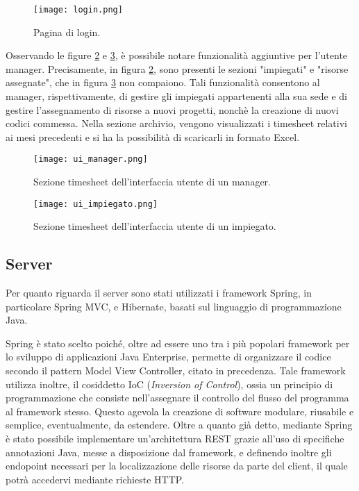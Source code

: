 \begin{figure}[H]
	\centering
	\texttt{[image: login.png]}
	\caption{Pagina di login.}	
	\label{fig:ui_login}
\end{figure}

\noindent
Osservando le figure \ref{fig:ui_manager} e \ref{fig:ui_impiegato}, è possibile notare funzionalità aggiuntive per l'utente manager. Precisamente, in figura \ref{fig:ui_manager}, sono presenti le sezioni "impiegati" e "risorse assegnate", che in figura \ref{fig:ui_impiegato} non compaiono. Tali funzionalità consentono al manager, rispettivamente, di gestire gli impiegati appartenenti alla sua sede e di gestire l'assegnamento di risorse a nuovi progetti, nonchè la creazione di nuovi codici commessa. Nella sezione archivio, vengono visualizzati i timesheet relativi ai mesi precedenti e si ha la possibilità di scaricarli in formato Excel.

\begin{figure}[H]
	\centering
	\texttt{[image: ui\_manager.png]}
	\caption{Sezione timesheet dell'interfaccia utente di un manager.}	
	\label{fig:ui_manager}
\end{figure}

\begin{figure}[H]
	\centering
	\texttt{[image: ui\_impiegato.png]}
	\caption{Sezione timesheet dell'interfaccia utente di un impiegato.}	
	\label{fig:ui_impiegato}
\end{figure}

\subsection{Server}
Per quanto riguarda il server sono stati utilizzati i framework Spring, in particolare Spring MVC, e Hibernate, basati sul linguaggio di programmazione Java.

Spring è stato scelto poiché, oltre ad essere uno tra i più popolari framework per lo sviluppo di applicazioni Java Enterprise, permette di organizzare il codice secondo il pattern Model View Controller, citato in precedenza. Tale framework utilizza inoltre, il cosiddetto IoC (\textit{Inversion of Control}), ossia un principio di programmazione che consiste nell'assegnare il controllo del flusso del programma al framework stesso. Questo agevola la creazione di software modulare, riusabile e semplice, eventualmente, da estendere. Oltre a quanto già detto, mediante Spring è stato possibile implementare un'architettura REST grazie all'uso di specifiche annotazioni Java, messe a disposizione dal framework, e definendo inoltre gli endopoint necessari per la localizzazione delle risorse da parte del client, il quale potrà accedervi mediante richieste HTTP. 

